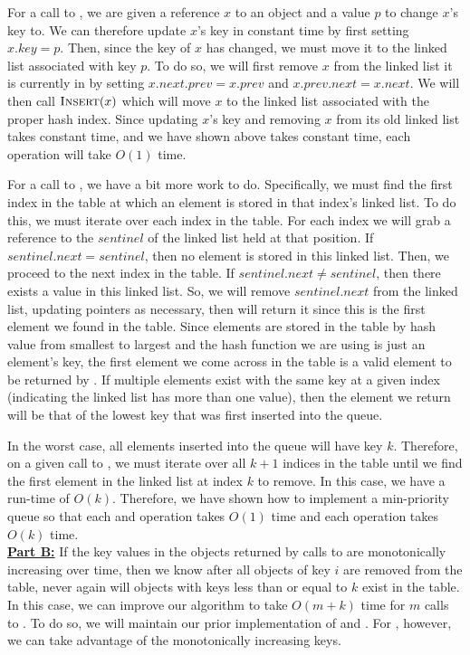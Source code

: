 \documentclass[11pt]{article}
\begin{document}
For a call to , we are given a reference $x$ to an object and a value $p$ to change $x$'s key to. We can therefore update $x$'s key in constant time by first setting $x.key = p$. Then, since the key of $x$ has changed, we must move it to the linked list associated with key $p$. To do so, we will first remove $x$ from the linked list it is currently in by setting $x.next.prev = x.prev$ and $x.prev.next = x.next$. We will then call $\textnormal{\scshape Insert}(x)$ which will move $x$ to the linked list associated with the proper hash index. Since updating $x$'s key and removing $x$ from its old linked list takes constant time, and we have shown above  takes constant time, each  operation will take $O(1)$ time.

For a call to , we have a bit more work to do. Specifically, we must find the first index in the table at which an element is stored in that index's linked list. To do this, we must iterate over each index in the table. For each index we will grab a reference to the $sentinel$ of the linked list held at that position. If $sentinel.next = sentinel$, then no element is stored in this linked list. Then, we proceed to the next index in the table. If $sentinel.next \neq sentinel$, then there exists a value in this linked list. So, we will remove $sentinel.next$ from the linked list, updating pointers as necessary, then will return it since this is the first element we found in the table. Since elements are stored in the table by hash value from smallest to largest and the hash function we are using is just an element's key, the first element we come across in the table is a valid element to be returned by . If multiple elements exist with the same key at a given index (indicating the linked list has more than one value), then the element we return will be that of the lowest key that was first inserted into the queue.

In the worst case, all elements inserted into the queue will have key $k$. Therefore, on a given call to , we must iterate over all $k+1$ indices in the table until we find the first element in the linked list at index $k$ to remove. In this case, we have a run-time of $O(k)$. Therefore, we have shown how to implement a min-priority queue so that each  and  operation takes $O(1)$ time and each  operation takes $O(k)$ time.\\

\textbf{\underline{Part B:}} If the key values in the objects returned by calls to  are monotonically increasing over time, then we know after all objects of key $i$ are removed from the table, never again will objects with keys less than or equal to $k$ exist in the table. In this case, we can improve our  algorithm to take $O(m+k)$ time for $m$ calls to . To do so, we will maintain our prior implementation of  and . For , however, we can take advantage of the monotonically increasing keys.
\end{document}
